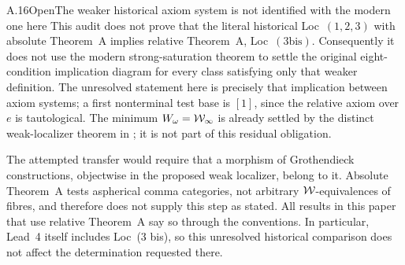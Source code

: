 \begin{claim}{A.16}{Open}{The weaker historical axiom system is not identified with the modern one here}
This audit does not prove that the literal historical Loc~$(1,2,3)$ with absolute Theorem~A implies relative Theorem~A, Loc~$(3\mathrm{bis})$. Consequently it does not use the modern strong-saturation theorem to settle the original eight-condition implication diagram for every class satisfying only that weaker definition. The unresolved statement here is precisely that implication between axiom systems; a first nonterminal test base is $[1]$, since the relative axiom over $e$ is tautological. The minimum $W_\omega=\mathcal{W}_{\infty}$ is already settled by the distinct weak-localizer theorem in ; it is not part of this residual obligation.
\end{claim}
The attempted transfer would require that a morphism of Grothendieck constructions, objectwise in the proposed weak localizer, belong to it. Absolute Theorem~A tests aspherical comma categories, not arbitrary $\mathcal{W}$-equivalences of fibres, and therefore does not supply this step as stated. All results in this paper that use relative Theorem~A say so through the conventions. In particular, Lead~4 itself includes Loc~(3 bis), so this unresolved historical comparison does not affect the determination requested there.

